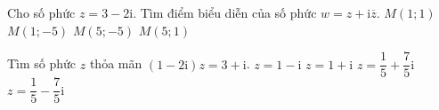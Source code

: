 \begin{ex}%
Cho số phức $z = 3 - 2\mathrm{i}$. Tìm điểm biểu diễn của số phức $w = z + \mathrm{i}\overline{z}$.
	\choice
	{\True $M\left(1; 1\right)$}
	{$M\left(1; - 5\right)$}
	{$M\left(5; - 5\right)$}
	{$M\left(5; 1\right)$}
\end{ex}


\begin{ex}%
	Tìm số phức $z$ thỏa mãn $\left(1 - 2\mathrm{i}\right)z = 3 + \mathrm{i}$.
	\choice
	{$z = 1 - \mathrm{i}$}
	{$z = 1 + \mathrm{i}$}
	{\True $z = \dfrac{1}{5} + \dfrac{7}{5}\mathrm{i}$}
	{$z = \dfrac{1}{5} - \dfrac{7}{5}\mathrm{i}$}
\end{ex}

